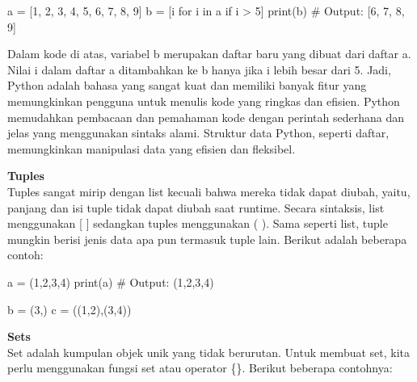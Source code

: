 \documentclass[
  letterpaper,
  DIV=11,
  numbers=noendperiod]{scrreprt}
\newenvironment{Shaded}{\begin{snugshade}}{\end{snugshade}}
\newcommand{\BuiltInTok}[1]{\textcolor[rgb]{0.00,0.23,0.31}{#1}}
\newcommand{\CommentTok}[1]{\textcolor[rgb]{0.37,0.37,0.37}{#1}}
\newcommand{\ControlFlowTok}[1]{\textcolor[rgb]{0.00,0.23,0.31}{#1}}
\newcommand{\DecValTok}[1]{\textcolor[rgb]{0.68,0.00,0.00}{#1}}
\newcommand{\KeywordTok}[1]{\textcolor[rgb]{0.00,0.23,0.31}{#1}}
\newcommand{\NormalTok}[1]{\textcolor[rgb]{0.00,0.23,0.31}{#1}}
\newcommand{\OperatorTok}[1]{\textcolor[rgb]{0.37,0.37,0.37}{#1}}
\begin{document}
\begin{Shaded}
\begin{Highlighting}[]
\NormalTok{a }\OperatorTok{=}\NormalTok{ [}\DecValTok{1}\NormalTok{, }\DecValTok{2}\NormalTok{, }\DecValTok{3}\NormalTok{, }\DecValTok{4}\NormalTok{, }\DecValTok{5}\NormalTok{, }\DecValTok{6}\NormalTok{, }\DecValTok{7}\NormalTok{, }\DecValTok{8}\NormalTok{, }\DecValTok{9}\NormalTok{]}
\NormalTok{b }\OperatorTok{=}\NormalTok{ [i }\ControlFlowTok{for}\NormalTok{ i }\KeywordTok{in}\NormalTok{ a }\ControlFlowTok{if}\NormalTok{ i }\OperatorTok{\textgreater{}} \DecValTok{5}\NormalTok{]}
\BuiltInTok{print}\NormalTok{(b)}
\CommentTok{\# Output: [6, 7, 8, 9]}
\end{Highlighting}
\end{Shaded}

Dalam kode di atas, variabel b merupakan daftar baru yang dibuat dari
daftar a. Nilai i dalam daftar a ditambahkan ke b hanya jika i lebih
besar dari 5. Jadi, Python adalah bahasa yang sangat kuat dan memiliki
banyak fitur yang memungkinkan pengguna untuk menulis kode yang ringkas
dan efisien. Python memudahkan pembacaan dan pemahaman kode dengan
perintah sederhana dan jelas yang menggunakan sintaks alami. Struktur
data Python, seperti daftar, memungkinkan manipulasi data yang efisien
dan fleksibel.

\textbf{Tuples}\\
Tuples sangat mirip dengan list kecuali bahwa mereka tidak dapat diubah,
yaitu, panjang dan isi tuple tidak dapat diubah saat runtime. Secara
sintaksis, list menggunakan {[} {]} sedangkan tuples menggunakan ( ).
Sama seperti list, tuple mungkin berisi jenis data apa pun termasuk
tuple lain. Berikut adalah beberapa contoh:

\begin{Shaded}
\begin{Highlighting}[]
\NormalTok{a }\OperatorTok{=}\NormalTok{ (}\DecValTok{1}\NormalTok{,}\DecValTok{2}\NormalTok{,}\DecValTok{3}\NormalTok{,}\DecValTok{4}\NormalTok{)}
\BuiltInTok{print}\NormalTok{(a)}
\CommentTok{\# Output: (1,2,3,4)}

\NormalTok{b }\OperatorTok{=}\NormalTok{ (}\DecValTok{3}\NormalTok{,)}
\NormalTok{c }\OperatorTok{=}\NormalTok{ ((}\DecValTok{1}\NormalTok{,}\DecValTok{2}\NormalTok{),(}\DecValTok{3}\NormalTok{,}\DecValTok{4}\NormalTok{))}
\end{Highlighting}
\end{Shaded}

\textbf{Sets}\\
Set adalah kumpulan objek unik yang tidak berurutan. Untuk membuat set,
kita perlu menggunakan fungsi set atau operator \{\}. Berikut beberapa
contohnya:
\end{document}
